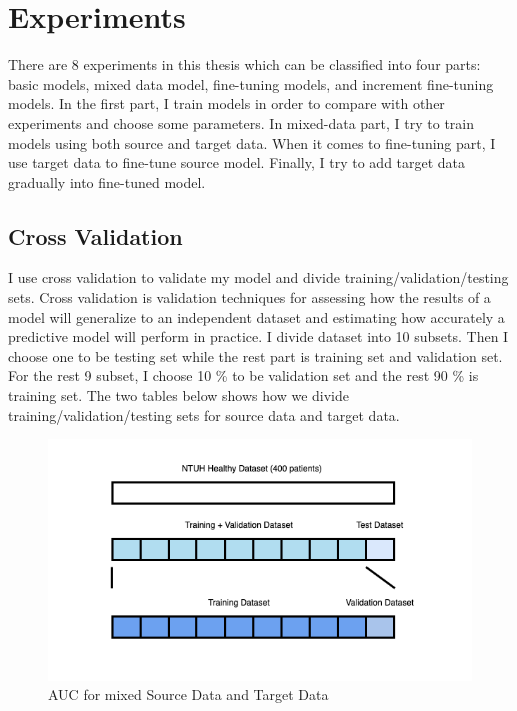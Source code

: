 \chapter{Experiments}
There are 8 experiments in this thesis which can be classified into four parts: basic models, mixed data model, fine-tuning models, and increment fine-tuning models. In the first part, I train models in order to compare with other experiments and choose some parameters. In mixed-data part, I try to train models using both source and target data. When it comes to fine-tuning part, I use target data to fine-tune source model. Finally, I try to add target data gradually into fine-tuned model.

\section{Cross Validation}
I use cross validation to validate my model and divide training/validation/testing sets. Cross validation is validation techniques for assessing how the results of a model will generalize to an independent dataset and estimating how accurately a predictive model will perform in practice. I divide dataset into 10 subsets. Then I choose one to be testing set while the rest part is training set and validation set. For the rest 9 subset, I choose 10 \% to be validation set and the rest 90 \% is training set. The two tables below shows how we divide training/validation/testing sets for source data and target data.


\begin{figure}[H]
    \hfil
    \begin{minipage}[t]{0.9\textwidth}
        \includegraphics[width=\textwidth]{fig/cross.png}
        \caption{\label{fig:parallel1} AUC for mixed Source Data and Target Data}
    \end{minipage}
    \hfil
\end{figure}
 
